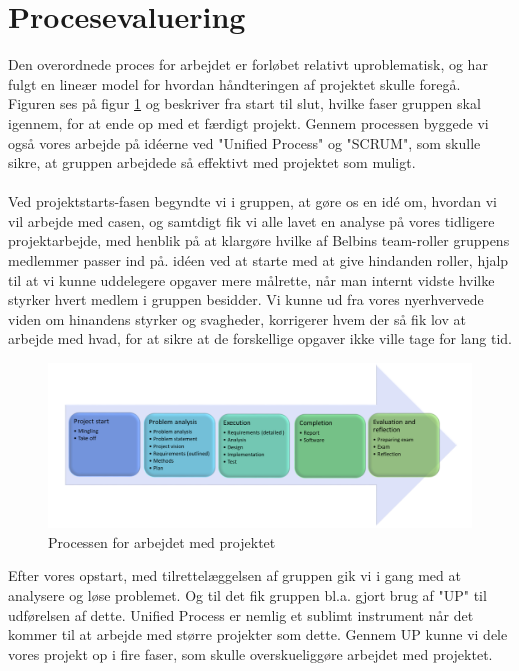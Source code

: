 \clearpage
\section{Procesevaluering}
Den overordnede proces for arbejdet er forløbet relativt uproblematisk, og har fulgt en lineær model for hvordan håndteringen af projektet skulle foregå. Figuren ses på figur \ref{fig:processen} og beskriver fra start til slut, hvilke faser gruppen skal igennem, for at ende op med et færdigt projekt. Gennem processen byggede vi også vores arbejde på idéerne ved "Unified Process" og "SCRUM", som skulle sikre, at gruppen arbejdede så effektivt med projektet som muligt.\\\\
Ved projektstarts-fasen begyndte vi i gruppen, at gøre os en idé om, hvordan vi vil arbejde med casen, og samtdigt fik vi alle lavet en analyse på vores tidligere projektarbejde, med henblik på at klargøre hvilke af Belbins team-roller gruppens medlemmer passer ind på. idéen ved at starte med at give hindanden roller, hjalp til at vi kunne uddelegere opgaver mere målrette, når man internt vidste hvilke styrker hvert medlem i gruppen besidder. Vi kunne ud fra vores nyerhvervede viden om hinandens styrker og svagheder, korrigerer hvem der så fik lov at arbejde med hvad, for at sikre at de forskellige opgaver ikke ville tage for lang tid. 
\begin{figure}[H]
    \centering
    \includegraphics[width=1\textwidth]{images/processen.png}
    \caption{Processen for arbejdet med projektet}
    \label{fig:processen}
\end{figure}
Efter vores opstart, med tilrettelæggelsen af gruppen gik vi i gang med at analysere og løse problemet. Og til det fik gruppen bl.a. gjort brug af "UP" til udførelsen af dette. Unified Process er nemlig et sublimt instrument når det kommer til at arbejde med større projekter som dette. Gennem UP kunne vi dele vores projekt op i fire faser, som skulle overskueliggøre arbejdet med projektet. 